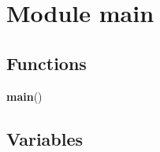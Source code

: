 %
%
%


\section{Module main}

    \label{main}


  \subsection{Functions}

    \label{main:main}

    \vspace{0.5ex}

\hspace{.8\funcindent}\begin{boxedminipage}{\funcwidth}

    \raggedright \textbf{main}()

\setlength{\parskip}{2ex}
\setlength{\parskip}{1ex}
    \end{boxedminipage}



  \subsection{Variables}


